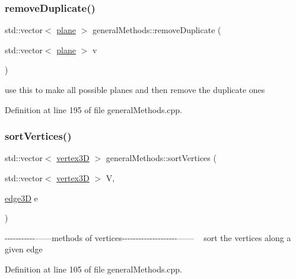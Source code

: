 \subsubsection{\texorpdfstring{remove\+Duplicate()}{removeDuplicate()}}
{\footnotesize\ttfamily std\+::vector$<$ \mbox{\hyperlink{structplane}{plane}} $>$ general\+Methods\+::remove\+Duplicate (\begin{DoxyParamCaption}\item[{std\+::vector$<$ \mbox{\hyperlink{structplane}{plane}} $>$}]{v }\end{DoxyParamCaption})}

use this to make all possible planes and then remove the duplicate ones 

Definition at line 195 of file general\+Methods.\+cpp.

\mbox{\label{namespacegeneral_methods_ace3487740f3b46dce9e0357366abf9ed}} 
\subsubsection{\texorpdfstring{sort\+Vertices()}{sortVertices()}}
{\footnotesize\ttfamily std\+::vector$<$ \mbox{\hyperlink{structvertex3_d}{vertex3D}} $>$ general\+Methods\+::sort\+Vertices (\begin{DoxyParamCaption}\item[{std\+::vector$<$ \mbox{\hyperlink{structvertex3_d}{vertex3D}} $>$}]{V,  }\item[{\mbox{\hyperlink{structedge3_d}{edge3D}}}]{e }\end{DoxyParamCaption})}

-\/-\/-\/-\/-\/-\/-\/-\/-\/-\/-\/------methods of vertices-\/-\/-\/-\/-\/-\/-\/-\/-\/-\/-\/-\/-\/-\/-\/-\/-\/-\/-\/-\/------ ~\newline
sort the vertices along a given edge 

Definition at line 105 of file general\+Methods.\+cpp.

